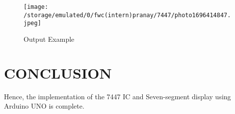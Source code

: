 \documentclass[conference]{IEEEtran}
\begin{document}
\begin{figure}[htbp] 
\centering 
\texttt{[image: /storage/emulated/0/fwc(intern)pranay/7447/photo1696414847.jpeg]}
\caption{\label{fig:Gates} Output Example}    
\end{figure}

\section{CONCLUSION}
Hence, the implementation of the 7447 IC and Seven-segment display using Arduino UNO is complete.
\end{document}

